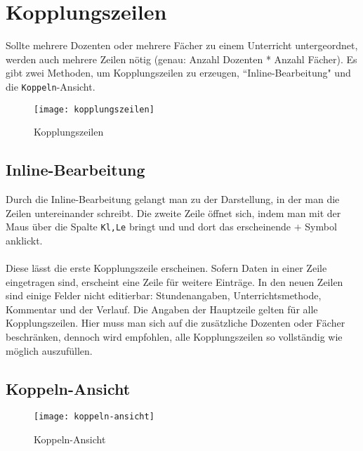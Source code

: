 \section{Kopplungszeilen}
\label{sec:kopplungszeilen}

Sollte mehrere Dozenten oder mehrere Fächer zu einem Unterricht untergeordnet, werden auch mehrere Zeilen nötig (genau: Anzahl Dozenten * Anzahl Fächer). Es gibt zwei Methoden, um Kopplungszeilen zu erzeugen, ``Inline-Bearbeitung" \hspace{1pt} und die \texttt{Koppeln}-Ansicht.

\newpage

\begin{figure}[h]
	\centering
	\texttt{[image: kopplungszeilen]}
	\vspace{-5pt}
	\caption{Kopplungszeilen}
	\label{fig:kopplungszeilen}
\end{figure}

\subsection{Inline-Bearbeitung}

Durch die Inline-Bearbeitung gelangt man zu der Darstellung, in der man die Zeilen untereinander schreibt. Die zweite Zeile öffnet sich, indem man mit der Maus über die Spalte \texttt{Kl,Le} bringt und und dort das erscheinende $+$ Symbol anklickt.\\
\\
Diese lässt die erste Kopplungszeile erscheinen. Sofern Daten in einer Zeile eingetragen sind, erscheint eine Zeile für weitere Einträge. In den neuen Zeilen sind einige Felder nicht editierbar: Stundenangaben, Unterrichtsmethode, Kommentar und der Verlauf. Die Angaben der Hauptzeile gelten für alle Kopplungszeilen. Hier muss man sich auf die zusätzliche Dozenten oder Fächer beschränken, dennoch wird empfohlen, alle Kopplungszeilen so vollständig wie möglich auszufüllen.

\subsection{Koppeln-Ansicht}

\begin{wrapfigure}{r}{0.35\textwidth}
	\vspace{-14pt}
	\texttt{[image: koppeln-ansicht]}
	\vspace{-5pt}
	\caption{Koppeln-Ansicht}
	\label{fig:koppeln-ansicht}
\end{wrapfigure}

